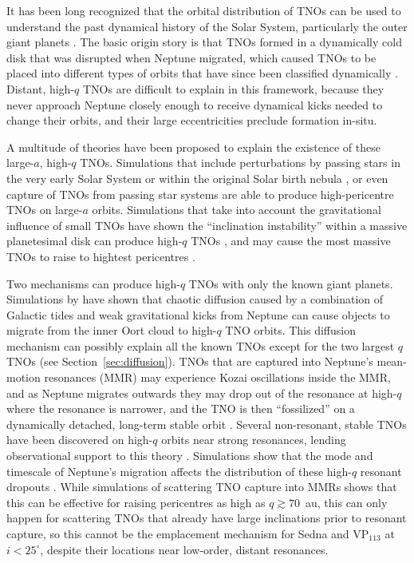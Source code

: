 \documentclass{aastex62}
\begin{document}
It has been long recognized that the orbital distribution of TNOs can be used to understand the past dynamical history of the Solar System, particularly the outer giant planets \citep{malhotra93,levison08}.
The basic origin story is that TNOs formed in a dynamically cold disk that was disrupted when Neptune migrated, which caused TNOs to be placed into different types of orbits that have since been classified dynamically \citep[see][]{gladman08}.  
Distant, high-$q$ TNOs are difficult to explain in this framework, because they never approach Neptune closely enough to receive dynamical kicks needed to change their orbits, and their large eccentricities preclude formation in-situ.  

A multitude of theories have been proposed to explain the existence of these large-$a$, high-$q$ TNOs.
Simulations that include perturbations by passing stars in the very early Solar System \citep{kenyonbromley04,morbidellilevison04,KaibQuinn2008,Pfalzneretal2018} or within the original Solar birth nebula \citep{brasser12,brasserschwamb15}, or even capture of TNOs from passing star systems \citep{kenyonbromley04,Jilkovaetal2015} are able to produce high-pericentre TNOs on large-$a$ orbits.
Simulations that take into account the gravitational influence of small TNOs have shown the ``inclination instability'' within a massive planetesimal disk can produce high-$q$ TNOs \citep{madigan2016}, and may cause the most massive TNOs to raise to hightest pericentres \citep{Fleisigetal2018}.

Two mechanisms can produce high-$q$ TNOs with only the known giant planets.
Simulations by \citet{bannister17} have shown that chaotic diffusion caused by a combination of Galactic tides and weak gravitational kicks from Neptune can cause objects to migrate from the inner Oort cloud to high-$q$ TNO orbits. 
This diffusion mechanism can possibly explain all the known TNOs except for the two largest $q$ TNOs (see Section~\ref{sec:diffusion}).
TNOs that are captured into Neptune's mean-motion resonances (MMR) may experience Kozai oscillations inside the MMR, and as Neptune migrates outwards they may drop out of the resonance at high-$q$ where the resonance is narrower, and the TNO is then ``fossilized'' on a dynamically detached, long-term stable orbit \citep{gomes03}.
Several non-resonant, stable TNOs have been discovered on high-$q$ orbits near strong resonances, lending observational support to this theory \citep{pike15,lawler18res}.
Simulations show that the mode and timescale of Neptune's migration affects the distribution of these high-$q$ resonant dropouts \citep{Nesvornyetal2016,kaib16}.
While simulations of scattering TNO capture into MMRs shows that this can be effective for raising pericentres as high as $q\gtrsim70$~au, this can only happen for scattering TNOs that already have large inclinations \citep{gallardo12} prior to resonant capture, so this cannot be the emplacement mechanism for Sedna and VP$_{113}$ at $i<25^{\circ}$, despite their locations near low-order, distant resonances.
\end{document}
